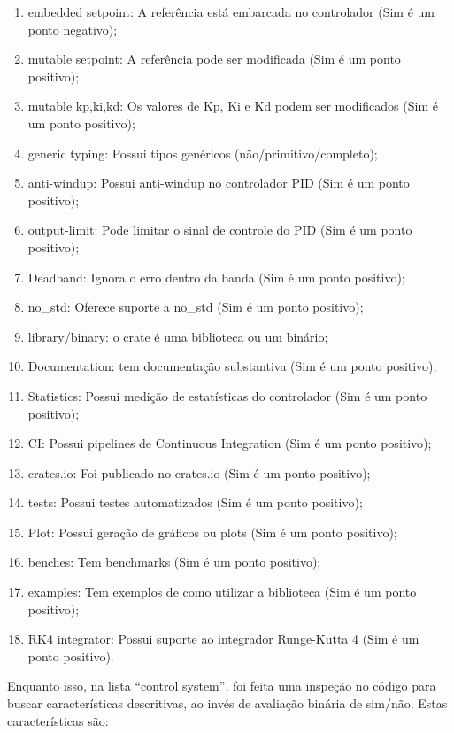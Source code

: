 \begin{enumerate}
  \item embedded setpoint: A referência está embarcada no controlador (Sim é um ponto negativo);
  \item mutable setpoint: A referência pode ser modificada (Sim é um ponto positivo);
  \item mutable kp,ki,kd: Os valores de Kp, Ki e Kd podem ser modificados (Sim é um ponto positivo);
  \item generic typing: Possui tipos genéricos (não/primitivo/completo);
  \item anti-windup: Possui anti-windup no controlador \ac{PID} (Sim é um ponto positivo);
  \item output-limit: Pode limitar o sinal de controle do \ac{PID} (Sim é um ponto positivo);
  \item Deadband: Ignora o erro dentro da banda (Sim é um ponto positivo);
  \item no\_std: Oferece suporte a no\_std (Sim é um ponto positivo);
  \item library/binary: o crate é uma biblioteca ou um binário;
  \item Documentation: tem documentação substantiva (Sim é um ponto positivo);
  \item Statistics: Possui medição de estatísticas do controlador (Sim é um ponto positivo);
  \item \ac{CI}: Possui pipelines de Continuous Integration (Sim é um ponto positivo);
  \item crates.io: Foi publicado no crates.io (Sim é um ponto positivo);
  \item tests: Possui testes automatizados (Sim é um ponto positivo);
  \item Plot: Possui geração de gráficos ou plots (Sim é um ponto positivo);
  \item benches: Tem benchmarks (Sim é um ponto positivo);
  \item examples: Tem exemplos de como utilizar a biblioteca (Sim é um ponto positivo);
  \item RK4 integrator: Possui suporte ao integrador Runge-Kutta 4 (Sim é um ponto positivo).
\end{enumerate}

Enquanto isso, na lista ``control system'', foi feita uma inspeção no código para buscar características descritivas, ao invés de avaliação binária de sim/não. Estas características são:


